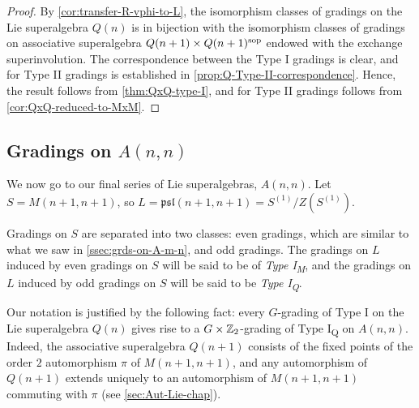 \begin{proof}
    By \cref{cor:transfer-R-vphi-to-L}, the isomorphism classes of gradings on the Lie superalgebra $Q(n)$ is in bijection with the isomorphism classes of gradings on associative superalgebra $Q(n+1) \times Q(n+1)^{\mathrm{sop}}$  endowed with the exchange superinvolution. 
    The correspondence between the Type I gradings is clear, and for Type II gradings is established in \cref{prop:Q-Type-II-correspondence}. 
    Hence, the result follows from \cref{thm:QxQ-type-I}, and for Type II gradings follows from
    \cref{cor:QxQ-reduced-to-MxM}.
    
    
    
\end{proof}



\subsection{Gradings on \texorpdfstring{$A(n,n)$}{A(n,n)}}\label{ssec:grds-on-Ann}

We now go to our final series of Lie superalgebras, $A(n,n)$. 
Let $S = M(n+1, n+1)$,  
so $L = \mathfrak{psl} (n+1, n+1) = S^{(1)}/Z(S^{(1)})$. 

Gradings on $S$ are separated into two classes: even gradings, which are similar to what we saw in \cref{ssec:grds-on-A-m-n}, and odd gradings. 
The gradings on $L$ induced by even gradings on $S$ will be said to be of \emph{Type I\textsubscript{M}}, and the gradings on $L$ induced by odd gradings on $S$ will be said to be \emph{Type I\textsubscript{Q}}. 

\begin{remark}\label{prop:Q-implies-GxZZ2-grading-on-M}
    Our notation is justified by the following fact: 
    every $G$-grading of Type I on the Lie superalgebra $Q(n)$ gives rise to a $G\times \mathbb{Z}_2$-grading of Type I\textsubscript{Q} on $A(n,n)$. 
    Indeed, the associative superalgebra $Q(n+1)$ consists of the fixed points of the order $2$ automorphism $\pi$ of $M(n+1, n+1)$, and any automorphism of $Q(n+1)$ extends uniquely to an automorphism of $M(n+1, n+1)$ commuting with $\pi$ (see \cref{sec:Aut-Lie-chap}). 
\end{remark}

